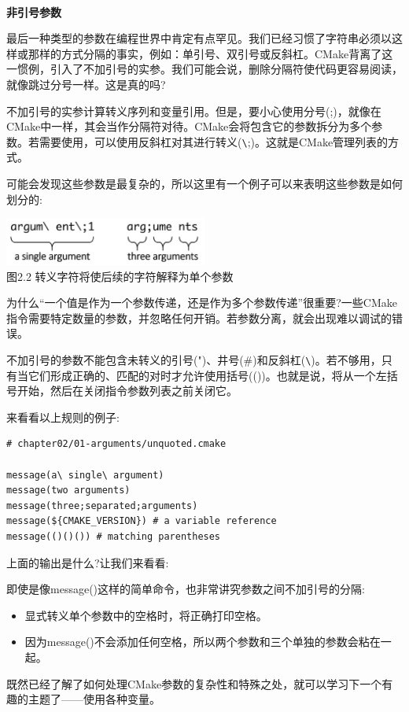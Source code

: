 \hspace*{\fill} \\ %
\noindent
\textbf{非引号参数}

最后一种类型的参数在编程世界中肯定有点罕见。我们已经习惯了字符串必须以这样或那样的方式分隔的事实，例如：单引号、双引号或反斜杠。CMake背离了这一惯例，引入了不加引号的实参。我们可能会说，删除分隔符使代码更容易阅读，就像跳过分号一样。这是真的吗?

不加引号的实参计算转义序列和变量引用。但是，要小心使用分号(;)，就像在CMake中一样，其会当作分隔符对待。CMake会将包含它的参数拆分为多个参数。若需要使用，可以使用反斜杠对其进行转义(\verb|\|;)。这就是CMake管理列表的方式。

可能会发现这些参数是最复杂的，所以这里有一个例子可以来表明这些参数是如何划分的:

\begin{center}
\includegraphics[width=0.5\textwidth]{content/1/chapter2/images/2.jpg}\\
图2.2 转义字符将使后续的字符解释为单个参数
\end{center}

\begin{tcolorbox}[colback=black!5!white,colframe=black!75!black,title=问题]
为什么“一个值是作为一个参数传递，还是作为多个参数传递”很重要?一些CMake指令需要特定数量的参数，并忽略任何开销。若参数分离，就会出现难以调试的错误。
\end{tcolorbox}

不加引号的参数不能包含未转义的引号(")、井号(\#)和反斜杠(\verb|\|)。若不够用，只有当它们形成正确的、匹配的对时才允许使用括号(())。也就是说，将从一个左括号开始，然后在关闭指令参数列表之前关闭它。

来看看以上规则的例子:

\begin{lstlisting}[style=styleCMake]
# chapter02/01-arguments/unquoted.cmake
	
message(a\ single\ argument)
message(two arguments)
message(three;separated;arguments)
message(${CMAKE_VERSION}) # a variable reference
message(()()()) # matching parentheses
\end{lstlisting}

上面的输出是什么?让我们来看看:


即使是像message()这样的简单命令，也非常讲究参数之间不加引号的分隔:

\begin{itemize}
\item 
显式转义单个参数中的空格时，将正确打印空格。

\item 
因为message()不会添加任何空格，所以两个参数和三个单独的参数会粘在一起。
\end{itemize}

既然已经了解了如何处理CMake参数的复杂性和特殊之处，就可以学习下一个有趣的主题了——使用各种变量。









